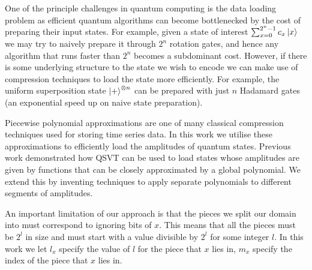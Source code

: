 \documentclass{revtex4-2}
\begin{document}
One of the principle challenges in quantum computing is the data loading problem as efficient quantum algorithms can become bottlenecked by the cost of preparing their input states. For example, given a state of interest $\sum_{x=0}^{2^n-1} c_x \ket{x}$ we may try to naively prepare it through $2^n$ rotation gates, and hence any algorithm that runs faster than $2^n$ becomes a subdominant cost. However, if there is some underlying structure to the state we wish to encode we can make use of compression techniques to load the state more efficiently. For example, the uniform superposition state $\ket{+}^{\otimes n}$ can be prepared with just $n$ Hadamard gates (an exponential speed up on naive state preparation).

Piecewise polynomial approximations are one of many classical compression techniques used for storing time series data. In this work we utilise these approximations to efficiently load the amplitudes of quantum states. Previous work \cite{mcardleQuantumStatePreparation2022, gonzalez-condeEfficientAmplitudeEncoding2023} demonstrated how QSVT can be used to load states whose amplitudes are given by functions that can be closely approximated by a global polynomial. We extend this by inventing techniques to apply separate polynomials to different segments of amplitudes.

An important limitation of our approach is that the pieces we split our domain into must correspond to ignoring bits of $x$. This means that all the pieces must be $2^l$ in size and must start with a value divisible by $2^l$ for some integer $l$. In this work we let $l_{x}$ specify the value of $l$ for the piece that $x$ lies in, $m_{x}$ specify the index of the piece that $x$ lies in.
\end{document}
